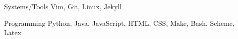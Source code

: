 

\begin{cvskills}

  \cvskill
    {Systems/Tools} %
    {Vim, Git, Linux, Jekyll} %

  \cvskill
    {Programming} %
    {Python, Java, JavaScript, HTML, CSS, Make, Bash, Scheme, Latex} %

\end{cvskills}
